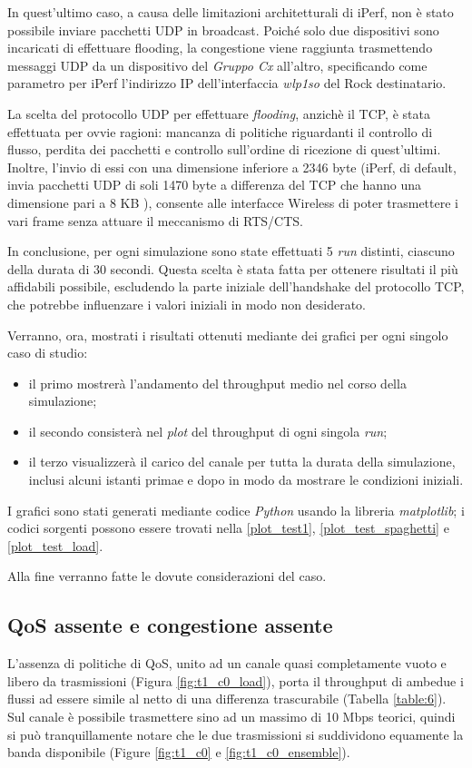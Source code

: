 In quest'ultimo caso, a causa delle limitazioni architetturali di iPerf, non è stato possibile inviare pacchetti UDP in broadcast. Poiché solo due dispositivi sono incaricati di effettuare flooding, la congestione viene raggiunta trasmettendo messaggi UDP da un dispositivo del \textit{Gruppo Cx} all'altro, specificando come parametro per iPerf l'indirizzo IP dell'interfaccia \textit{wlp1so} del Rock destinatario.

La scelta del protocollo UDP per effettuare \textit{flooding}, anzichè il TCP, è stata effettuata per ovvie ragioni: mancanza di politiche riguardanti il controllo di flusso, perdita dei pacchetti e controllo sull'ordine di ricezione di quest'ultimi. Inoltre, l'invio di essi con una dimensione inferiore a 2346 byte (iPerf, di default, invia pacchetti UDP di soli 1470 byte a differenza del TCP che hanno una dimensione pari a 8 KB \cite{iperf}), consente alle interfacce Wireless di poter trasmettere i vari frame senza attuare il meccanismo di RTS/CTS.

In conclusione, per ogni simulazione sono state effettuati 5 \textit{run} distinti, ciascuno della durata di 30 secondi. Questa scelta è stata fatta per ottenere risultati il più affidabili possibile, escludendo la parte iniziale dell'handshake del protocollo TCP, che potrebbe influenzare i valori iniziali in modo non desiderato.

Verranno, ora, mostrati i risultati ottenuti mediante dei grafici per ogni singolo caso di studio:

\begin{itemize}
    \item il primo mostrerà l'andamento del throughput medio nel corso della simulazione;
    \item il secondo consisterà nel \textit{plot} del throughput di ogni singola \textit{run};
    \item il terzo visualizzerà il carico del canale per tutta la durata della simulazione, inclusi alcuni istanti primae e dopo in modo da mostrare le condizioni iniziali.
\end{itemize}

\noindent I grafici sono stati generati mediante codice \textit{Python} usando la libreria \textit{matplotlib}; i codici sorgenti possono essere trovati nella \autoref{plot_test1}, \autoref{plot_test_spaghetti} e \autoref{plot_test_load}.

Alla fine verranno fatte le dovute considerazioni del caso.

\subsection[QoS assente e congestione assente]{QoS assente e congestione assente}
L'assenza di politiche di QoS, unito ad un canale quasi completamente vuoto e libero da trasmissioni (Figura \ref{fig:t1_c0_load}), porta il throughput di ambedue i flussi ad essere simile al netto di una differenza trascurabile (Tabella \ref{table:6}). Sul canale è possibile trasmettere sino ad un massimo di 10 Mbps teorici, quindi si può tranquillamente notare che le due trasmissioni si suddividono equamente la banda disponibile (Figure \ref{fig:t1_c0} e \ref{fig:t1_c0_ensemble}).

